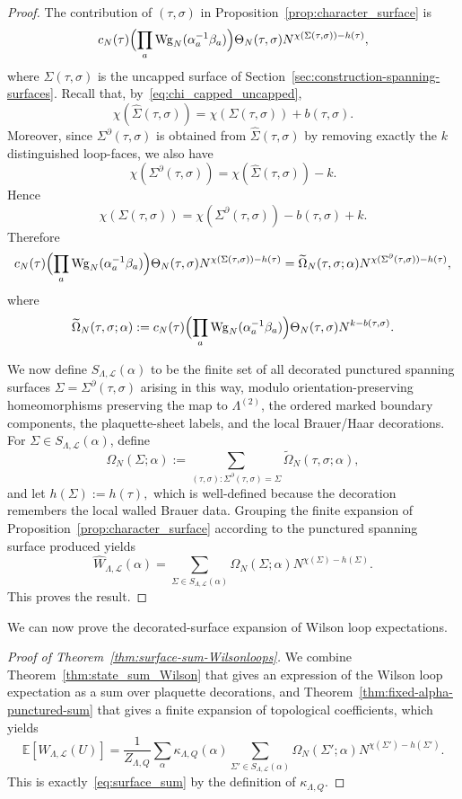 \documentclass[11pt,a4paper,reqno]{article}
\theoremstyle{definition}
\theoremstyle{remark}
\newcommand\Lc{{\mathcal{L}}}
\begin{document}
\begin{proof}
The contribution of $(\tau,\sigma)$ in Proposition~\ref{prop:character_surface} is
\[
c_N(\tau)\Bigl(\prod_a \mathrm{Wg}_N(\alpha_a^{-1}\beta_a)\Bigr)\Theta_N(\tau,\sigma) N^{\chi(\Sigma(\tau,\sigma))-h(\tau)},
\]
where $\Sigma(\tau,\sigma)$ is the uncapped surface of Section~\ref{sec:construction-spanning-surfaces}. Recall that, by~\eqref{eq:chi_capped_uncapped},
\[
\chi(\widehat\Sigma(\tau,\sigma))=\chi(\Sigma(\tau,\sigma))+b(\tau,\sigma).
\]
Moreover, since $\Sigma^\partial(\tau,\sigma)$ is obtained from $\widehat\Sigma(\tau,\sigma)$ by removing exactly the $k$ distinguished loop-faces, we also have
\[
\chi(\Sigma^\partial(\tau,\sigma))= \chi(\widehat\Sigma(\tau,\sigma)) - k.
\]
Hence
\[
\chi(\Sigma(\tau,\sigma)) = \chi(\Sigma^\partial(\tau,\sigma)) - b(\tau,\sigma)+k.
\]
Therefore
\[
c_N(\tau)\Bigl(\prod_a \mathrm{Wg}_N(\alpha_a^{-1}\beta_a)\Bigr)\Theta_N(\tau,\sigma) N^{\chi(\Sigma(\tau,\sigma))-h(\tau)}= \widetilde\Omega_N(\tau,\sigma;\alpha) N^{\chi(\Sigma^\partial(\tau,\sigma))-h(\tau)},
\]
where
\[
\widetilde\Omega_N(\tau,\sigma;\alpha):= c_N(\tau)\Bigl(\prod_a \mathrm{Wg}_N(\alpha_a^{-1}\beta_a)\Bigr)\Theta_N(\tau,\sigma) N^{k-b(\tau,\sigma)}.
\]

We now define $S_{\Lambda,\Lc}(\alpha)$ to be the finite set of all decorated punctured spanning surfaces $\Sigma=\Sigma^\partial(\tau,\sigma)$ arising in this way, modulo orientation-preserving homeomorphisms preserving the map to $\Lambda^{(2)}$, the ordered marked boundary components, the plaquette-sheet labels, and the local Brauer/Haar decorations. For $\Sigma\in S_{\Lambda,\Lc}(\alpha)$, define
\[
\Omega_N(\Sigma;\alpha) := \sum_{(\tau,\sigma):\Sigma^\partial(\tau,\sigma)=\Sigma} \widetilde\Omega_N(\tau,\sigma;\alpha),
\]
and let $h(\Sigma):=h(\tau),$ which is well-defined because the decoration remembers the local walled Brauer data. Grouping the finite expansion of Proposition~\ref{prop:character_surface} according to the punctured spanning surface produced yields
\[
\widehat{W}_{\Lambda,\Lc}(\alpha) = \sum_{\Sigma\in S_{\Lambda,\Lc}(\alpha)} \Omega_N(\Sigma;\alpha) N^{\chi(\Sigma)-h(\Sigma)}.
\]
This proves the result.
\end{proof}

We can now prove the decorated-surface expansion of Wilson loop expectations.

\begin{proof}[Proof of Theorem~\ref{thm:surface-sum-Wilsonloops}]
We combine Theorem~\ref{thm:state_sum_Wilson} that gives an expression of the Wilson loop expectation as a sum over plaquette decorations, and Theorem~\ref{thm:fixed-alpha-punctured-sum} that gives a finite expansion of topological coefficients, which yields
\[
\mathbb E[W_{\Lambda,\Lc}(U)]=\frac1{Z_{\Lambda,Q}} \sum_\alpha \kappa_{\Lambda,Q}(\alpha) \sum_{\Sigma'\in S_{\Lambda,\Lc}(\alpha)} \Omega_N(\Sigma';\alpha) N^{\chi(\Sigma')-h(\Sigma')}.
\]
This is exactly~\eqref{eq:surface_sum} by the definition of $\kappa_{\Lambda,Q}$.
\end{proof}
\end{document}
